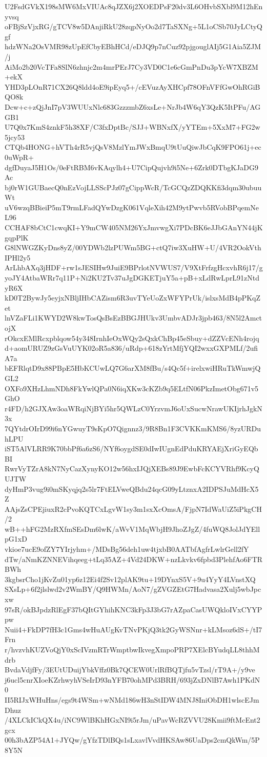 U2FsdGVkX198sMW6MxVIUAc8qJZX6j2XOEDPsF20dv3L6OHvbSXbl9M12hEnyvsq
oFBjSzVjxRG/gTCV8w5DAnjiRkU28zqpNyOo2d7TaSXNg+5L1oCSb70JyLCtyQgf
hdzWNa2OsVMR98zUpEfCbyEBhHCd/eDJQ9p7nCuz92pjgouglAIj5G1Aia5ZJM/j
AiMo2b20VcTFa8SlN6zhnjc2m4mrPErJ7Cy3VD0C1e6cGmPnDu3pYcW7XBZM+ekX
YHD3pLOnR71CX26Q8ldd4oE9ipEyq5+/cEVuzAyXHCpf78OFnVFfGwOhRGiBQO8k
Dcw+c+zQjJnI7pV3WUUxNlc683GzzzmbZ6xsLe+NrJb4W6qY3QzK5ItPFu/AGGB1
U7Q0x7KmS4znkF5h38XF/C3fxDptBc/SJJ+WBNxfX/yYTEm+5XxM7+FG2w5jcy53
CTQb4HONG+hVTh4rR5vjQsV8MzlYmJWxBmqU9tUuQiwJbCqK9FPO61j+ec0uWpR+
dgfDuyaJ5H1Os/0eFtRBM6vKAqylh4+U7CipQujvh9i5Ne+6Zrk0DTbgKJaDG9Ac
bj0rW1GUBaecQ0nEzVojLLSScPJz07gCippWcR/TcGCQzZDQKKfi3dqm30ubuuWt
uV6wzqBBieiP5mT9rmLFadQYwDzgK061VqleXih42M9ytPwvb5RVobBPqemNeL96
CCHAF8bCtC1cwqKI+Y9mCW405NM26YxJmvwgXi7PDcBK6eJJbGAnYN44jKgqpPlK
G8lNWGZKyDns8yZ/00YDWb2lzPUWm5BG+ctQ7iw3XuHW+U/4VR2OokVthIPHl2y5
ArLhbAXq3jHDF+rw1sJESIHw9JuiE9BPrlotNVWUS7/V9XtFrfzgHcxvhR6j17/g
yoJY4AtbaWRr7q11P+Ni2KU2Tv37uJgDGKETjuY5a+pB+xLdRwLprL91zNtdyR6X
kD0T2BywJy5eyjxNBljIHbCAZism6R3uvTYeUoZxWFYPrUk/islxsMdB4pPKqZet
lnVZaFLi1KWYD2W8kwTosQsBsEzBBGJHUkv3UmbvADJr3jpb463/8N5l2AmctojX
rOkcxEMlRcxpblqow54y348IrnhIeOxWQy2sQxkChBp45eSbuy+dZZVcENh4rojq
d+aomURUZ9zGsVuUYK02oR5a836/uRdp+618zYrtMfjYQI2wxxGXPMLf/2ufiA7a
bEFRlqtD9x88PBpE5HbKCUwLQ7G6arXM8fBu/s4Qc5f+irelxwiHRuTkWmwjQGL2
OXFo9XHzLhmNDh8FkYwlQPa0N6iqXKw3cKZb9q5ELtfN06PkzImetObg671v5GhO
r4FD/h2GJXAw3oaWRqiNjBYi5hr5QWLzC0YrzvmJ6oUxSucwNrawUKIjrhJgkN3x
7QYtdrOIrD99i6nYGwuyT9sKpO7Qignnz3/9R8Bn1F3CVKKmKMS6/8yzURDuhLPU
iST5AlVLRR9K70bbPf6a6zS6/NYf6oygdSE0dIwIUgnEdPduKRYAEjXriGyEQbBI
RwrVyTZrA8kN7NyCazXynyKO12w56hxIJQjXEBs89J9EwbFcKCYVRhf9KcyQUJTW
dyHmP3vug9i0mSKyqjq2s5lr7FtELVweQBdu24qcG09yLtznxA2IDPSJuMdHcX5Z
AAjsZsCPEjiuxR2cPvoKQTCxLgvW1sy3m1sxXcOmsA/FjpN7IdWaUiZ5iPkgCH/2
wB++hFG2MzRXfmSEsDm6lwK/aWvV1MqWbjH9JhoZJgZ/4fuWQ8JolJdYEllpG1xD
vkioe7ucE9ofZY7YIrjyhm+/MDsBg56deh1uw4tjxbB0AATbfAgfrLwlrGell2fY
dTw/aNmKZNNEVihqeeg+tLq35AZ+4Vd24DKW+nzLkvkv6fpbd3PlehfAo6FTRBWh
3kgbsrCho1jKvZu01yp6z12Ei4f2Sv12plAK9tu+19DYnxS5V+9u4YyY4LVnstXQ
SXsLp+6f2jlslwd2v2WmBY/Q9HWMn/AoN7/gZVGZEtG7Hadvasa2Xulj5wbJpcxw
97sR/okBJpdzRlEgF37bQItGYhihKNC3kFp3J3bG7rAZpaCasUWQkloIVxCYYPpw
Nuii4+FkDP7fH3c1Gms4wHuAUgKvTNvPKjQ3tk2GyWSNnr+kLMsoz6dS+/tI7Frn
r/hvzvhKUZVoQjY0xScIVzmRTrWmptbwIkvegXmpoPRP7XElcBYudqLL8thhMdrb
BvdaVdjfFy/3EUtUDuijYbkVffz0Bk7QCEW0UrlRfBQTjfu5vTzsl/rT9A+/y9ve
j6ucl5cnrXIoeKZrhwyhVSeIrD93nYFB70ohMPd3BRH/693jZxDNlB7Awh1PKdN0
II5RIJxWHuHns/egs9t4WSm+wNMd186wH3nStIDW4MNJ8IniObDH1wlscEJmDhuz
/4XLCkICkQX4u/iNC9WlBKhHGxNI9i5rJm/uPavWcRZVVU28Kmii9ftMcEnt2gcx
00h3bAZP54A1+JYQw/gYfzTDlBQs1sLxavlVvdHKSAw86UaDps2cmQkWm/5P8Y5N
